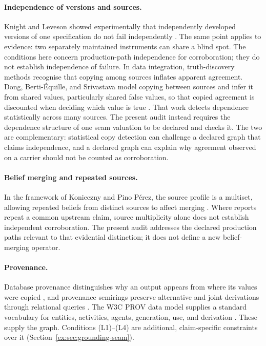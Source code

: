 \documentclass[smallextended,envcountsect,envcountsame,natbib]{svjour3}
\begin{document}
\paragraph{Independence of versions and sources.} Knight and Leveson showed experimentally that independently developed versions of one specification do not fail independently \citep{knightleveson1986}. The same point applies to evidence: two separately maintained instruments can share a blind spot. The conditions here concern production-path independence for corroboration; they do not establish independence of failure. In data integration, truth-discovery methods recognise that copying among sources inflates apparent agreement. Dong, Berti-\'Equille, and Srivastava model copying between sources and infer it from shared values, particularly shared false values, so that copied agreement is discounted when deciding which value is true \citep{dong2009}. That work detects dependence statistically across many sources. The present audit instead requires the dependence structure of one seam valuation to be declared and checks it. The two are complementary: statistical copy detection can challenge a declared graph that claims independence, and a declared graph can explain why agreement observed on a carrier should not be counted as corroboration.

\paragraph{Belief merging and repeated sources.}
In the framework of Konieczny and Pino P\'erez, the source profile
is a multiset, allowing repeated beliefs from distinct sources to
affect merging \citep{konieczny2002merging}. Where reports repeat
a common upstream claim, source multiplicity alone does not establish
independent corroboration. The present audit addresses the declared
production paths relevant to that evidential distinction; it does
not define a new belief-merging operator.

\paragraph{Provenance.} Database provenance distinguishes why an output appears from where its values were copied \citep{buneman2001}, and provenance semirings preserve alternative and joint derivations through relational queries \citep{greenkarvounarakistannen2007}. The W3C PROV data model supplies a standard vocabulary for entities, activities, agents, generation, use, and derivation \citep{w3cprovdm2013}. These supply the graph. Conditions (L1)--(L4) are additional, claim-specific constraints over it (Section~\ref{ex:sec:grounding-seam}).
\end{document}
